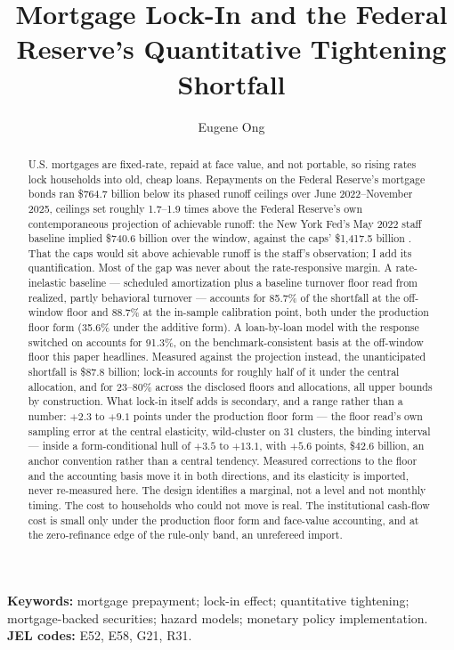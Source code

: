\documentclass[12pt]{article}
\title{Mortgage Lock-In and the Federal Reserve's Quantitative Tightening Shortfall}
\author{Eugene Ong}
\affil{Carnegie Mellon University}
\date{}
\begin{document}
\maketitle
\begin{abstract}
\noindent U.S. mortgages are fixed-rate, repaid at face value, and not portable, so rising rates lock households into old, cheap loans. Repayments on the Federal Reserve's mortgage bonds ran \$764.7 billion below its phased runoff ceilings over June 2022--November 2025, ceilings set roughly 1.7--1.9 times above the Federal Reserve's own contemporaneous projection of achievable runoff: the New York Fed's May 2022 staff baseline implied \$740.6 billion over the window, against the caps' \$1{,}417.5 billion \citep{nyfed2022}. That the caps would sit above achievable runoff is the staff's observation; I add its quantification. Most of the gap was never about the rate-responsive margin. A rate-inelastic baseline --- scheduled amortization plus a baseline turnover floor read from realized, partly behavioral turnover --- accounts for 85.7\% of the shortfall at the off-window floor and 88.7\% at the in-sample calibration point, both under the production floor form (35.6\% under the additive form). A loan-by-loan model with the response switched on accounts for 91.3\%, on the benchmark-consistent basis at the off-window floor this paper headlines. Measured against the projection instead, the unanticipated shortfall is \$87.8 billion; lock-in accounts for roughly half of it under the central allocation, and for 23--80\% across the disclosed floors and allocations, all upper bounds by construction. What lock-in itself adds is secondary, and a range rather than a number: $+2.3$ to $+9.1$ points under the production floor form --- the floor read's own sampling error at the central elasticity, wild-cluster on 31 clusters, the binding interval --- inside a form-conditional hull of $+3.5$ to $+13.1$, with $+5.6$ points, \$42.6 billion, an anchor convention rather than a central tendency. Measured corrections to the floor and the accounting basis move it in both directions, and its elasticity is imported, never re-measured here. The design identifies a marginal, not a level and not monthly timing. The cost to households who could not move is real. The institutional cash-flow cost is small only under the production floor form and face-value accounting, and at the zero-refinance edge of the rule-only band, an unrefereed import.
\end{abstract}

\vspace{0.5\baselineskip}
{\footnotesize\noindent\textbf{Keywords:} mortgage prepayment; lock-in effect; quantitative tightening; mortgage-backed securities; hazard models; monetary policy implementation.\\
\textbf{JEL codes:} E52, E58, G21, R31.\par}
\newpage
\end{document}
